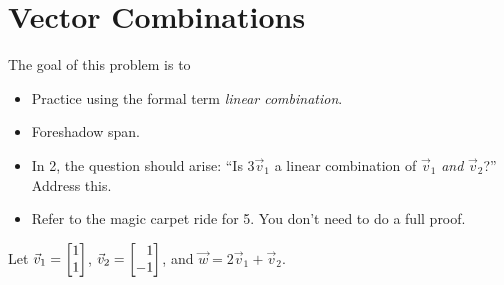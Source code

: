 \documentclass{problemset}
\newcommand{\bookonlynewpage}{\begin{bookonly}\newpage\end{bookonly}}
\begin{document}
	\bookonlynewpage
\section*{Vector Combinations}
	\vspace{-1em}


	\question
	\label{ProbSkewBasis}
	\begin{annotation}
		\begin{goals}

			The goal of this problem is to
			\begin{itemize}
				\item Practice using the formal term \emph{linear combination}.
				\item Foreshadow span.
			\end{itemize}
		\end{goals}

		\begin{notes}
			\begin{itemize}
				\item In 2, the question should arise: ``Is $3\vec v_1$
					a linear combination of $\vec v_1$ \emph{and}
					$\vec v_2$?'' Address this.
				\item Refer to the magic carpet ride for 5. You don't
					need to do a full proof.
			\end{itemize}
		\end{notes}
	\end{annotation}
	Let $\vec v_1=\mat{1\\1}$, $\vec v_2=\mat{1\\-1}$, and $\vec w=2\vec v_1+\vec v_2$.
\end{document}

